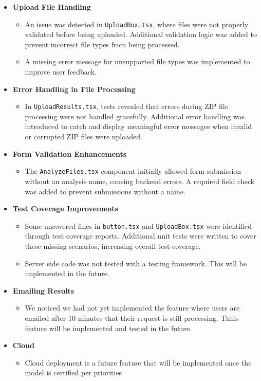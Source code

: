 \documentclass[12pt, titlepage]{article}
\begin{document}
\begin{itemize}
\item \textbf{Upload File Handling}
\begin{itemize}
\item An issue was detected in \texttt{UploadBox.tsx}, where files were not properly validated before being uploaded. Additional validation logic was added to prevent incorrect file types from being processed.
\item A missing error message for unsupported file types was implemented to improve user feedback.
\end{itemize}
\item \textbf{Error Handling in File Processing}
\begin{itemize}
\item In \texttt{UploadResults.tsx}, tests revealed that errors during ZIP file processing were not handled gracefully. Additional error handling was introduced to catch and display meaningful error messages when invalid or corrupted ZIP files were uploaded.
\end{itemize}
\item \textbf{Form Validation Enhancements}
\begin{itemize}
\item The \texttt{AnalyzeFiles.tsx} component initially allowed form submission without an analysis name, causing backend errors. A required field check was added to prevent submissions without a name.
\end{itemize}
\item \textbf{Test Coverage Improvements}
\begin{itemize}
\item Some uncovered lines in \texttt{button.tsx} and \texttt{UploadBox.tsx} were identified through test coverage reports. Additional unit tests were written to cover these missing scenarios, increasing overall test coverage.
\item Server side code was not tested with a testing framework. This will be implemented in the future.
\end{itemize}
\item \textbf{Emailing Results}
\begin{itemize}
\item We noticed we had not yet implemented the feature where users are emailed after 10 minutes that their request is still processing. Thhis feature will be implemented and tested in the future.
\end{itemize}
\item \textbf{Cloud}
\begin{itemize}
\item Cloud deployment is a future feature that will be implemented once the model is certified per priorities
\end{itemize}
\end{itemize}
\end{document}

